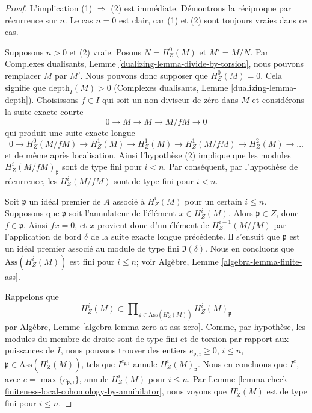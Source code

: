 \begin{proof}
L'implication (1) $\Rightarrow$ (2) est immédiate. Démontrons la réciproque
par récurrence sur $n$. Le cas $n = 0$ est clair, car (1) et
(2) sont toujours vraies dans ce cas.

\medskip\noindent
Supposons $n > 0$ et (2) vraie. Posons $N = H^0_Z(M)$ et $M' = M/N$.
Par Complexes dualisants, Lemme \ref{dualizing-lemma-divide-by-torsion},
nous pouvons remplacer $M$ par $M'$.
Nous pouvons donc supposer que $H^0_Z(M) = 0$.
Cela signifie que $\text{depth}_I(M) > 0$
(Complexes dualisants, Lemme \ref{dualizing-lemma-depth}).
Choisissons $f \in I$ qui soit un non-diviseur de zéro dans $M$ et considérons la suite
exacte courte
$$
0 \to M \to M \to M/fM \to 0
$$
qui produit une suite exacte longue
$$
0 \to H^0_Z(M/fM) \to H^1_Z(M) \to H^1_Z(M) \to H^1_Z(M/fM) \to
H^2_Z(M) \to \ldots
$$
et de même après localisation. Ainsi l'hypothèse (2) implique que
les modules $H^i_Z(M/fM)_\mathfrak p$ sont de type fini pour $i < n$. Par conséquent,
par l'hypothèse de récurrence, les $H^i_Z(M/fM)$ sont de type fini pour $i < n$.

\medskip\noindent
Soit $\mathfrak p$ un idéal premier de $A$ associé à
$H^i_Z(M)$ pour un certain $i \leq n$. Supposons que $\mathfrak p$ soit l'annulateur
de l'élément $x \in H^i_Z(M)$. Alors $\mathfrak p \in Z$, donc
$f \in \mathfrak p$. Ainsi $fx = 0$, et $x$ provient donc d'un
élément de $H^{i - 1}_Z(M/fM)$ par l'application de bord $\delta$ de la suite
exacte longue précédente. Il s'ensuit que $\mathfrak p$ est un idéal premier associé
au module de type fini $\Im(\delta)$. Nous en concluons que
$\text{Ass}(H^i_Z(M))$ est fini pour $i \leq n$; voir
Algèbre, Lemme \ref{algebra-lemma-finite-ass}.

\medskip\noindent
Rappelons que
$$
H^i_Z(M) \subset
\prod\nolimits_{\mathfrak p \in \text{Ass}(H^i_Z(M))}
H^i_Z(M)_\mathfrak p
$$
par Algèbre, Lemme \ref{algebra-lemma-zero-at-ass-zero}. Comme, par
hypothèse, les modules du membre de droite sont de type fini et de torsion par rapport aux puissances de $I$,
nous pouvons trouver des entiers $e_{\mathfrak p, i} \geq 0$, $i \leq n$,
$\mathfrak p \in \text{Ass}(H^i_Z(M))$, tels que
$I^{e_{\mathfrak p, i}}$ annule $H^i_Z(M)_\mathfrak p$. Nous en concluons
que $I^e$, avec $e = \max\{e_{\mathfrak p, i}\}$, annule $H^i_Z(M)$
pour $i \leq n$. Par
Lemme \ref{lemma-check-finiteness-local-cohomology-by-annihilator},
nous voyons que $H^i_Z(M)$ est de type fini pour $i \leq n$.
\end{proof}


